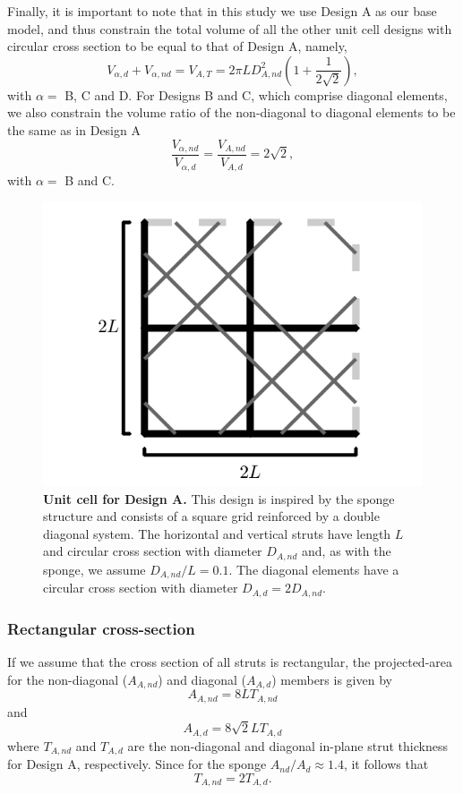 \documentclass[10pt,twoside]{fernandes_supp}
\begin{document}
Finally, it is important to note that in this study we use Design A as our base model, and thus constrain the total volume of all the other unit cell designs with circular cross section to be equal to that of Design A, namely,
\begin{equation}\label{con1}
V_{\alpha,d}+V_{\alpha,nd}={V}_{A,T}=2\pi L D_{A,nd}^2 \left(1+\frac{1}{2\sqrt{2}}\right),
\end{equation}
with $\alpha=$ B, C and D.
For Designs B and C, which comprise diagonal elements, we also  constrain the volume ratio of the non-diagonal to diagonal elements to be the same as in Design A
\begin{equation}\label{con2}
\frac{V_{\alpha,nd}}{V_{\alpha,d}}=\frac{V_{A,nd}}{V_{A,d}}=2\sqrt{2},
\end{equation}
with $\alpha=$ B and C.

\begin{figure}[H]
    \centering
    \includegraphics[width=0.4\linewidth]{SFig2.png}
    \caption{{\bf Unit cell for Design A.} This design is inspired by the sponge structure and consists of a square grid  reinforced by a double diagonal system. The horizontal and vertical struts have length $L$ and circular cross section with diameter $D_{A,nd}$ and, as with the sponge, we assume $D_{A,nd}/L=0.1$. The diagonal elements have a circular cross section  with diameter $D_{A,d}=2 D_{A,nd}$.}
    \label{DesignA}
\end{figure}

\subsubsection{Rectangular cross-section}

If we assume that the cross section of all struts is rectangular, the projected-area  for the non-diagonal ($A_{A,nd}$) and diagonal ($A_{A,d}$) members is given by
\begin{equation}
	A_{A,nd}=8LT_{A,nd}
\end{equation}
and
\begin{equation}
	A_{A,d}=8\sqrt{2}LT_{A,d}
\end{equation}
where  $T_{A,nd}$ and $T_{A,d}$ are the non-diagonal and diagonal in-plane strut thickness for Design A, respectively.
Since for the sponge   $A_{nd}/A_d\approx 1.4$, it follows that
\begin{equation}
	T_{A,nd}=2T_{A,d}.
\end{equation}
\end{document}

